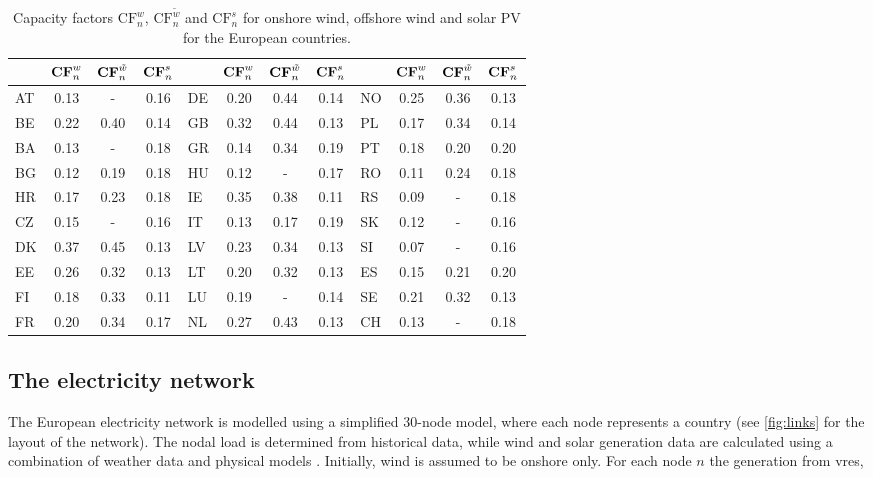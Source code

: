 \documentclass[a4paper, 5p, sort&compress]{elsarticle}%
\begin{document}
\begin{table}[t!]
  \caption{Capacity factors $\text{CF}_n^w$, $\text{CF}_n^{\tilde{w}}$ and  $\text{CF}_n^s$ for onshore wind, offshore wind and solar PV for the European countries.}
  \label{tab:capacity-factors}
  \begin{adjustbox}{center}
    \begin{tabular}{lccclccclccc}  \toprule
      & $\text{\textbf{CF}}_n^w$ & $\text{\textbf{CF}}_n^{\tilde{w}}$ & $\text{\textbf{CF}}_n^s$ &  & $\text{\textbf{CF}}_n^w$ &
      $\text{\textbf{CF}}_n^{\tilde{w}}$ & $\text{\textbf{CF}}_n^s$ &  & $\text{\textbf{CF}}_n^w$ & $\text{\textbf{CF}}_n^{\tilde{w}}$ &
      $\text{\textbf{CF}}_n^s$\\ \midrule
      AT & 0.13 & - & 0.16 & DE & 0.20 & 0.44 & 0.14 & NO & 0.25 & 0.36 & 0.13\\
      BE & 0.22 & 0.40 & 0.14 & GB & 0.32 & 0.44 & 0.13 & PL & 0.17 & 0.34 & 0.14\\
      BA & 0.13 & - & 0.18 & GR & 0.14 & 0.34 & 0.19 & PT & 0.18 & 0.20 & 0.20\\
      BG & 0.12 & 0.19 & 0.18 & HU & 0.12 & - & 0.17 & RO & 0.11 & 0.24 & 0.18\\
      HR & 0.17 & 0.23 & 0.18 & IE & 0.35 & 0.38 & 0.11 & RS & 0.09 & - & 0.18\\
      CZ & 0.15 & - & 0.16 & IT & 0.13 & 0.17 & 0.19 & SK & 0.12 & - & 0.16\\
      DK & 0.37 & 0.45 & 0.13 & LV & 0.23 & 0.34 & 0.13 & SI & 0.07 & - & 0.16\\
      EE & 0.26 & 0.32 & 0.13 & LT & 0.20 & 0.32 & 0.13 & ES & 0.15 & 0.21 & 0.20\\
      FI & 0.18 & 0.33 & 0.11 & LU & 0.19 & - & 0.14 & SE & 0.21 & 0.32 & 0.13\\
      FR & 0.20 & 0.34 & 0.17 & NL & 0.27 & 0.43 & 0.13 & CH & 0.13 & - & 0.18\\ \bottomrule
    \end{tabular}
  \end{adjustbox}
\end{table}


\subsection{The electricity network}
\label{sec:network}

The European electricity network is modelled using a simplified
30-node model, where each node represents a country (see \cref{fig:links} for the layout of the network). The nodal load is
determined from historical data, while wind and solar generation data
are calculated using a combination of weather data and physical models
\cite{REA}. Initially, wind is assumed to be onshore only. For each
node $n$ the generation from \gls{vres},
\end{document}
